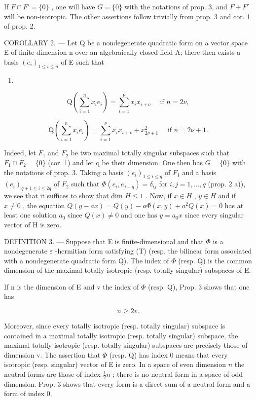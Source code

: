 If \(F \cap F' = \{0\}\) , one will have \(G = \{0\}\) with the notations of prop. 3, and \(F + F'\) will be non-isotropic. The other assertions follow trivially from prop. 3 and cor. 1 of prop. 2.

COROLLARY 2. --- Let Q be a nondegenerate quadratic form on a vector space E of finite dimension n over an algebraically closed field A; there then exists a basis \((e_i)_{1 \leqslant i \leqslant n}\) of E such that

\begin{enumerate}
\def\labelenumi{(\arabic{enumi})}
\setcounter{enumi}{1}
\tightlist
\item
\end{enumerate}

\[
\mathrm{Q} (\sum_ {i = 1} ^ {n} x _ {i} e _ {i}) = \sum_ {i = 1} ^ {\nu} x _ {i} x _ {i + \nu} \quad \text {   if   } n = 2 \nu ,\tag{3}
\]

\[
\mathrm{Q} \left(\sum_ {i = 1} ^ {n} x _ {i} e _ {i}\right) = \sum_ {i = 1} ^ {\nu} x _ {i} x _ {i + \nu} + x _ {2 \nu + 1} ^ {2} \quad \text {   if   } n = 2 \nu + 1.
\]

Indeed, let \(F_{1}\) and \(F_{2}\) be two maximal totally singular subspaces such that \(F_{1} \cap F_{2} = \{0\}\) (cor. 1) and let q be their dimension. One then has \(G = \{0\}\) with the notations of prop. 3. Taking a basis \((e_{i})_{1 \leqslant i \leqslant q}\) of \(F_{1}\) and a basis \((e_{i})_{q+1 \leqslant i \leqslant 2q}\) of \(F_{2}\) such that \(\Phi(e_{i}, e_{j+q}) = \delta_{ij}\) for \(i, j = 1, \ldots, q\) (prop. 2 a)), we see that it suffices to show that dim \(H \leqslant 1\) . Now, if \(x \in H\) , \(y \in H\) and if \(x \neq 0\) , the equation \(Q(y - ax) = Q(y) - a\Phi(x, y) + a^{2}Q(x) = 0\) has at least one solution \(a_{0}\) since \(Q(x) \neq 0\) and one has \(y = a_{0}x\) since every singular vector of H is zero.

DEFINITION 3. --- Suppose that E is finite-dimensional and that \(\Phi\) is a nondegenerate \(\varepsilon\) -hermitian form satisfying (T) (resp. the bilinear form associated with a nondegenerate quadratic form Q). The index of \(\Phi\) (resp. Q) is the common dimension of the maximal totally isotropic (resp. totally singular) subspaces of E.

If n is the dimension of E and v the index of \(\Phi\) (resp. Q), Prop. 3 shows that one has

\[
n \geqslant 2 v.\tag{4}
\]

Moreover, since every totally isotropic (resp. totally singular) subspace is contained in a maximal totally isotropic (resp. totally singular) subspace, the maximal totally isotropic (resp. totally singular) subspaces are precisely those of dimension v. The assertion that \(\Phi\) (resp. Q) has index 0 means that every isotropic (resp. singular) vector of E is zero. In a space of even dimension \(n\) the neutral forms are those of index \(\frac{1}{2} n\) ; there is no neutral form in a space of odd dimension. Prop. 3 shows that every form is a direct sum of a neutral form and a form of index 0.

